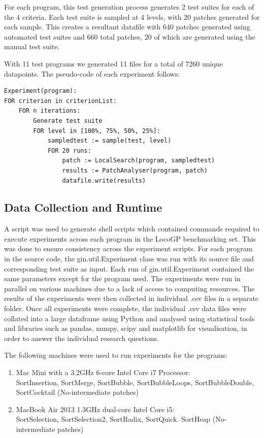 \documentclass[titlepage]{article}
\begin{document}
For each program, this test generation process generates 2 test suites for each of the 4 criteria. Each test suite is sampled at 4 levels, with 20 patches generated for each sample. This creates a resultant datafile with 640 patches generated using automated test suites and 660 total patches, 20 of which are generated using the manual test suite. 

With 11 test programs we generated 11 files for a total of 7260 unique datapoints.  The pseudo-code of each experiment follows:
\begin{lstlisting}
Experiment(program):
FOR criterion in criterionList:
	FOR n iterations:
		Generate test suite
		FOR level in [100%, 75%, 50%, 25%]:
			sampledtest := sample(test, level)
			FOR 20 runs:
				patch := LocalSearch(program, sampledtest)
				results := PatchAnalyser(program, patch)
				datafile.write(results)

\end{lstlisting}


\subsection{Data Collection and Runtime}
A script was used to generate shell scripts which contained commands required to execute experiments across each program in the LocoGP benchmarking set. This was done to ensure consistency across the experiment scripts. For each program in the source code, the gin.util.Experiment class was run with its source file and corresponding test suite as input. Each run of gin.util.Experiment contained the same parameters except for the program used. The experiments were run in parallel on various machines due to a lack of access to computing resources. The results of the experiments were then collected in individual .csv files in a separate folder. Once all experiments were complete, the individual .csv data files were collated into a large dataframe using Python and analysed using statistical tools and libraries such as pandas, numpy, scipy and matplotlib for visualisation, in order to answer the individual research questions.

The following machines were used to run experiments for the programs:
\begin{enumerate}
	\item Mac Mini with a 3.2GHz 6-core Intel Core i7 Processor: \\
SortInsertion, SortMerge, SortBubble, SortBubbleLoops, SortBubbleDouble, SortCocktail (No-intermediate patches)
	\item MacBook Air 2013 1.3GHz dual-core Intel Core i5: \\
SortSelection, SortSelection2, SortRadix, SortQuick. SortHeap (No-intermediate patches)
\end{enumerate}
\end{document}
